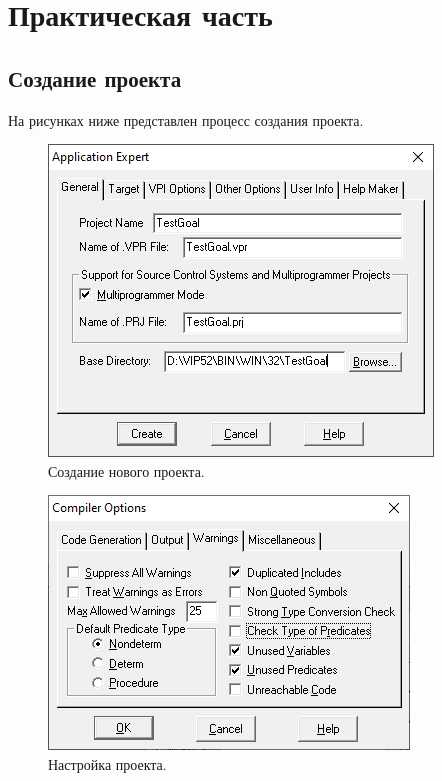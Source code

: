 \chapter{Практическая часть}

\section{Создание проекта}
На рисунках ниже представлен процесс создания проекта.
\begin{figure}[H]
    \centering
    \includegraphics[scale=.7]{data/image/gen_1.png}
    \caption{Создание нового проекта.}
\end{figure}
\begin{figure}[H]
    \centering
    \includegraphics[scale=.7]{data/image/gen_2.png}
    \caption{Настройка проекта.}
\end{figure}
